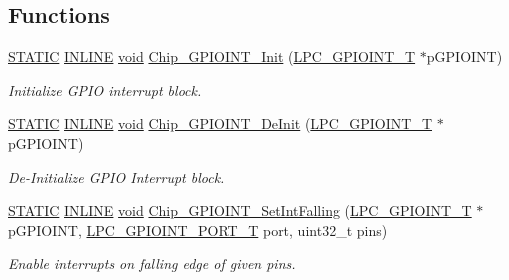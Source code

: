 \subsection*{Functions}
\begin{DoxyCompactItemize}
\item 
\hyperlink{group__LPC__Types__Public__Macros_ga10b2d890d871e1489bb02b7e70d9bdfb}{S\-T\-A\-T\-I\-C} \hyperlink{group__LPC__Types__Public__Types_ga2eb6f9e0395b47b8d5e3eeae4fe0c116}{I\-N\-L\-I\-N\-E} \hyperlink{Paradigm_2Tern__EE_2small_2portmacro_8h_a14d32f8130d3c0b212cfc751730b5b49}{void} \hyperlink{group__GPIOINT__17XX__40XX_gaa35c955336ff3dc2f850f7e6cf9feee0}{Chip\-\_\-\-G\-P\-I\-O\-I\-N\-T\-\_\-\-Init} (\hyperlink{structLPC__GPIOINT__T}{L\-P\-C\-\_\-\-G\-P\-I\-O\-I\-N\-T\-\_\-\-T} $\ast$p\-G\-P\-I\-O\-I\-N\-T)
\begin{DoxyCompactList}\small\item\em Initialize G\-P\-I\-O interrupt block. \end{DoxyCompactList}\item 
\hyperlink{group__LPC__Types__Public__Macros_ga10b2d890d871e1489bb02b7e70d9bdfb}{S\-T\-A\-T\-I\-C} \hyperlink{group__LPC__Types__Public__Types_ga2eb6f9e0395b47b8d5e3eeae4fe0c116}{I\-N\-L\-I\-N\-E} \hyperlink{Paradigm_2Tern__EE_2small_2portmacro_8h_a14d32f8130d3c0b212cfc751730b5b49}{void} \hyperlink{group__GPIOINT__17XX__40XX_ga469286ac9a7cf6065584e9f29dda2293}{Chip\-\_\-\-G\-P\-I\-O\-I\-N\-T\-\_\-\-De\-Init} (\hyperlink{structLPC__GPIOINT__T}{L\-P\-C\-\_\-\-G\-P\-I\-O\-I\-N\-T\-\_\-\-T} $\ast$p\-G\-P\-I\-O\-I\-N\-T)
\begin{DoxyCompactList}\small\item\em De-\/\-Initialize G\-P\-I\-O Interrupt block. \end{DoxyCompactList}\item 
\hyperlink{group__LPC__Types__Public__Macros_ga10b2d890d871e1489bb02b7e70d9bdfb}{S\-T\-A\-T\-I\-C} \hyperlink{group__LPC__Types__Public__Types_ga2eb6f9e0395b47b8d5e3eeae4fe0c116}{I\-N\-L\-I\-N\-E} \hyperlink{Paradigm_2Tern__EE_2small_2portmacro_8h_a14d32f8130d3c0b212cfc751730b5b49}{void} \hyperlink{group__GPIOINT__17XX__40XX_ga59d69f2c748bc4816268a7b4714f8058}{Chip\-\_\-\-G\-P\-I\-O\-I\-N\-T\-\_\-\-Set\-Int\-Falling} (\hyperlink{structLPC__GPIOINT__T}{L\-P\-C\-\_\-\-G\-P\-I\-O\-I\-N\-T\-\_\-\-T} $\ast$p\-G\-P\-I\-O\-I\-N\-T, \hyperlink{group__GPIOINT__17XX__40XX_ga41631ac5e33fde341c0afe680ded9fee}{L\-P\-C\-\_\-\-G\-P\-I\-O\-I\-N\-T\-\_\-\-P\-O\-R\-T\-\_\-\-T} port, uint32\-\_\-t pins)
\begin{DoxyCompactList}\small\item\em Enable interrupts on falling edge of given {\itshape pins}. \end{DoxyCompactList}\item 

\end{DoxyCompactItemize}
